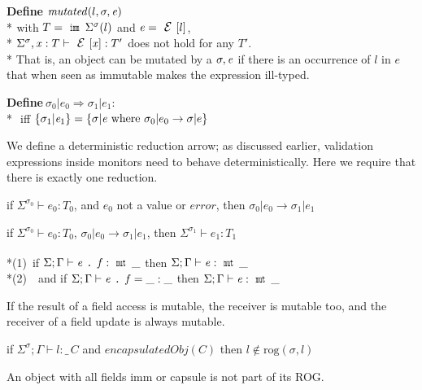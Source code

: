 \noindent\textbf{Define} $\mathit{mutated}(l,\sigma,\e)$\\*
${}_{}$\quad\quad with $T=\Kw{imm}\,\Sigma^\sigma(l)$ and $\e=\ctx[l]$,\\*
${}_{}$\quad\quad $\Sigma^\sigma,\x:T\vdash\ctx[\x]:T'$ does not hold for any $T'$.\\*
\noindent That is, an object can be mutated by a $\sigma,\e$ if there is an occurrence of 
$l$ in $e$ that when seen as immutable makes the expression ill-typed.



\noindent\textbf{Define}$\ \sigma_0|e_0\Rightarrow \sigma_1|e_1$:\\*
${}_{}$\quad\quad
iff $\{\sigma_1|\e_1\}=\{\sigma|\e \text{ where } \sigma_0|e_0\rightarrow \sigma|e\}$

\noindent We define
a deterministic reduction arrow;
as discussed earlier, validation expressions inside monitors need to behave deterministically.
Here we require that there is exactly one reduction.



\begin{Assumption}[Progress]
if $\Sigma^{\sigma_0}\vdash e_0: T_0$,
and $e_0$ not a value or $\mathit{error}$, then
$\sigma_0|e_0\rightarrow \sigma_1|e_1$
\end{Assumption}


\begin{Assumption}[SubjectReductionBase]
if $\Sigma^{\sigma_0}\vdash e_0: T_0$,
$\sigma_0|e_0\rightarrow \sigma_1|e_1$,
then
$\Sigma^{\sigma_1}\vdash e_1: T_1$
\end{Assumption}


\begin{Assumption}[MutField]
${}_{}$\\*(1)\ if $\Sigma;\Gamma\vdash\e\singleDot\f:\Kw{mut}\,\_$
then $\Sigma;\Gamma\vdash\e:\Kw{mut}\,\_$
\\*(2)\ \ and
if $\Sigma;\Gamma\vdash\e\singleDot\f=\_:\_$
then $\Sigma;\Gamma\vdash\e:\Kw{mut}\,\_$
\end{Assumption}
If the result of a field access is mutable,
the receiver is mutable too, and the receiver of a field update is always mutable.

\begin{Assumption}[HeadNotCircular]
if   $\Sigma^\sigma;\Gamma\vdash l:\_\,C$ and $\mathit{encapsulatedObj}(C)$ 
 then $l\notin\text{rog}(\sigma,l)$
\end{Assumption}
An object with all fields imm or capsule is not part of its ROG.


